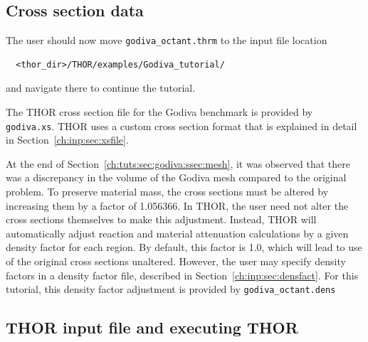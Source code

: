 \subsection{Cross section data}

The user should now move \verb"godiva_octant.thrm" to the input file location
\begin{verbatim}
  <thor_dir>/THOR/examples/Godiva_tutorial/
\end{verbatim}
and navigate there to continue the tutorial.

The \ac{THOR} cross section file for the Godiva benchmark is provided by \verb"godiva.xs".
\ac{THOR} uses a custom cross section format that is explained in detail in Section~\ref{ch:inp:sec:xsfile}.

At the end of Section~\ref{ch:tuts:sec:godiva:ssec:mesh}, it was observed that there was a discrepancy in the volume of the Godiva mesh compared to the original problem.
To preserve material mass, the cross sections must be altered by increasing them by a factor of 1.056366.
In \ac{THOR}, the user need not alter the cross sections themselves to make this adjustment.
Instead, \ac{THOR} will automatically adjust reaction and material attenuation calculations by a given density factor for each region.
By default, this factor is 1.0, which will lead to use of the original cross sections unaltered.
However, the user may specify density factors in a density factor file, described in Section~\ref{ch:inp:sec:densfact}.
For this tutorial, this density factor adjustment is provided by \verb"godiva_octant.dens"

\subsection{THOR input file and executing THOR}

